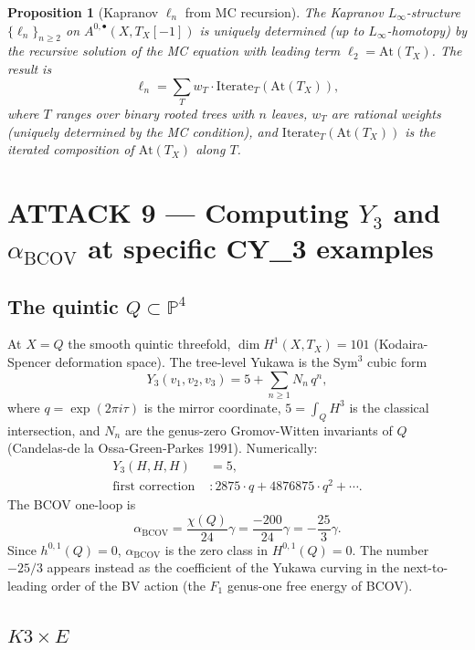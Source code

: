 \documentclass[11pt]{article}
\newtheorem{proposition}[theorem]{Proposition}
\providecommand{\At}{\mathrm{At}}
\providecommand{\BCOV}{\mathrm{BCOV}}
\begin{document}
\begin{proposition}[Kapranov $\ell_n$ from MC recursion]
\label{prop:ln-mc}
The Kapranov $L_\infty$-structure $\{\ell_n\}_{n \geq 2}$ on $A^{0,
\bullet}(X, T_X[-1])$ is uniquely determined (up to $L_\infty$-homotopy)
by the recursive solution of the MC equation with leading term
$\ell_2 = \At(T_X)$. The result is
\[
  \ell_n = \sum_T w_T \cdot \mathrm{Iterate}_T(\At(T_X)),
\]
where $T$ ranges over binary rooted trees with $n$ leaves, $w_T$ are
rational weights (uniquely determined by the MC condition), and
$\mathrm{Iterate}_T(\At(T_X))$ is the iterated composition of $\At(T_X)$
along $T$.
\end{proposition}

\section{ATTACK 9 --- Computing $Y_3$ and $\alpha_\BCOV$ at specific
CY_3 examples}
\label{sec:attack-9}

\subsection{The quintic $Q \subset \mathbb P^4$}

At $X = Q$ the smooth quintic threefold, $\dim H^1(X, T_X) = 101$
(Kodaira-Spencer deformation space). The tree-level Yukawa is the
$\mathrm{Sym}^3$ cubic form
\[
  Y_3(v_1, v_2, v_3) = 5 + \sum_{n \geq 1} N_n \, q^n,
\]
where $q = \exp(2\pi i \tau)$ is the mirror coordinate, $5 = \int_Q H^3$
is the classical intersection, and $N_n$ are the genus-zero Gromov-Witten
invariants of $Q$ (Candelas-de la Ossa-Green-Parkes 1991). Numerically:
\begin{align*}
  Y_3(H, H, H) &= 5, \\
  \text{first correction } &: 2875 \cdot q + 4876875 \cdot q^2 +
    \cdots.
\end{align*}
The BCOV one-loop is
\[
  \alpha_\BCOV = \frac{\chi(Q)}{24} \gamma = \frac{-200}{24} \gamma =
    -\frac{25}{3} \gamma.
\]
Since $h^{0,1}(Q) = 0$, $\alpha_\BCOV$ is the zero class in $H^{0,1}(Q) =
0$. The number $-25/3$ appears instead as the coefficient of the Yukawa
curving in the next-to-leading order of the BV action (the $F_1$ genus-one
free energy of BCOV).

\subsection{$K3 \times E$}
\end{document}
